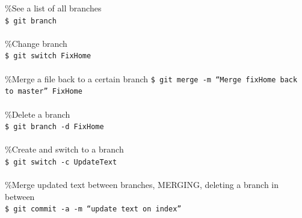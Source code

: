 \documentclass[10pt, a4paper,ngerman]{article}
\begin{document}
\%See a list of all branches\\
\texttt{\$ git branch}\\\\
\%Change branch\\
\texttt{\$ git switch FixHome}\\\\
\%Merge a file back to a certain branch
\texttt{\$ git merge -m ``Merge fixHome back to master'' FixHome}\\\\
\%Delete a branch\\
\texttt{\$ git branch -d FixHome}\\\\
\%Create and switch to a branch\\
\texttt{\$ git switch -c UpdateText}\\\\
\%Merge updated text between branches, MERGING, deleting a branch in between\\
\texttt{\$ git commit -a -m ``update text on index''}\\\\
\end{document}
